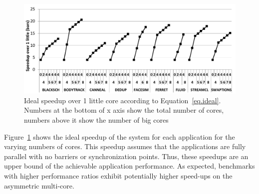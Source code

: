 \begin{figure}[t]%
	\centering
	\includegraphics[width=1\columnwidth]{figures/ideal_speedup.pdf}
	\vspace{-0.5cm}
	\caption{Ideal speedup over 1 little core according to Equation~\ref{eq.ideal}. Numbers at the bottom of x axis show the total number of cores, numbers above it show the number of big cores}
	\label{fig:ideal}%
\end{figure}

Figure~\ref{fig:ideal} shows the ideal speedup of the system for each application for the varying 
numbers of cores. This speedup assumes that the applications are fully parallel with no barriers or 
synchronization points. Thus, these speedups are an upper bound of the achievable application performance.
As expected, benchmarks with higher performance ratios exhibit potentially higher speed-ups on the asymmetric multi-core.
